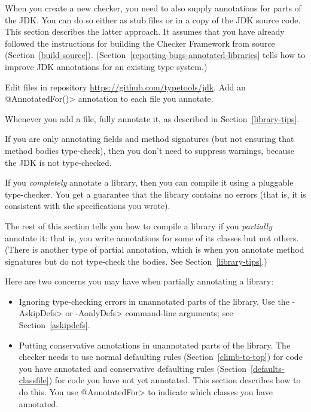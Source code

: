 
When you create a new checker, you need to also supply annotations for
parts of the JDK\@.  You can do so either as stub files or in a copy of the
JDK source code.  This
section describes the latter approach.
It assumes that you have already followed the instructions for building the
Checker Framework from source (Section~\ref{build-source}).
(Section~\ref{reporting-bugs-annotated-libraries} tells how to improve
JDK annotations for an existing type system.)

Edit files in repository \url{https://github.com/typetools/jdk}.  Add
an \<@AnnotatedFor()> annotation to each file you annotate.

Whenever you add a file, fully annotate it, as described in
Section~\ref{library-tips}.

If you are only annotating fields and method signatures (but not
ensuring that method bodies type-check), then you don't need to suppress
warnings, because the JDK is not type-checked.



If you \emph{completely} annotate a library, then you can compile it using a
pluggable type-checker.  You get a guarantee that the library contains no
errors (that is, it is consistent with the specifications you wrote).

The rest of this section tells you how to compile a library if you
\emph{partially} annotate it:  that is, you write annotations for some of its
classes but not others.
(There is another type of partial annotation, which is when you annotate
method signatures but do not type-check the bodies.
See Section~\ref{library-tips}.)

Here are two concerns you may have when partially annotating a library:

\begin{itemize}
\item
  Ignoring type-checking errors in unannotated parts of the library.
  Use the \<-AskipDefs> or \<-AonlyDefs> command-line arguments; see
  Section~\ref{askipdefs}.

\item
  Putting conservative annotations in unannotated parts of the library.
  The checker needs to use normal defaulting rules
  (Section~\ref{climb-to-top}) for code you have annotated and conservative
  defaulting rules (Section~\ref{defaults-classfile}) for code you have not
  yet annotated.  This section describes how to do this.  You use
  \<@AnnotatedFor> to indicate which classes you have annotated.
\end{itemize}



